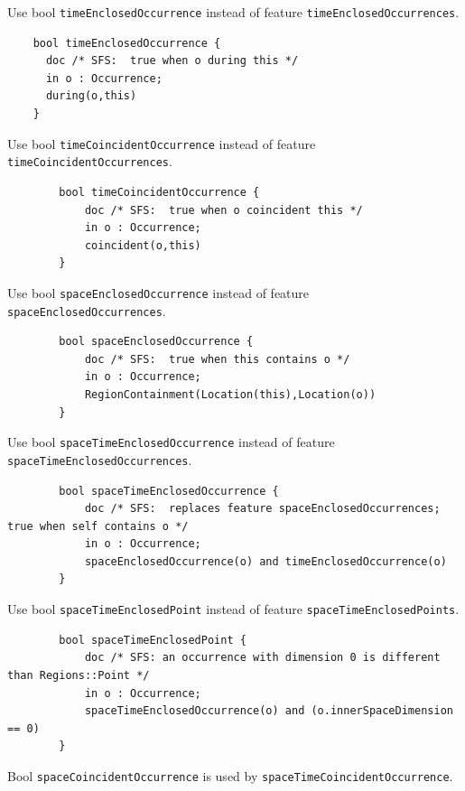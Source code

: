 \pn Use bool \texttt{timeEnclosedOccurrence} instead of feature \texttt{timeEnclosedOccurrences}.

\begin{lstlisting}
    bool timeEnclosedOccurrence {
      doc /* SFS:  true when o during this */
      in o : Occurrence;
      during(o,this)
    }
\end{lstlisting}

\pn Use bool \texttt{timeCoincidentOccurrence} instead of feature \texttt{timeCoincidentOccurrences}.

\begin{lstlisting}
		bool timeCoincidentOccurrence {
			doc /* SFS:  true when o coincident this */
			in o : Occurrence;
			coincident(o,this)
		}
\end{lstlisting}

\pn Use bool \texttt{spaceEnclosedOccurrence} instead of feature \texttt{spaceEnclosedOccurrences}.

\begin{lstlisting}
		bool spaceEnclosedOccurrence {
			doc /* SFS:  true when this contains o */
			in o : Occurrence;
			RegionContainment(Location(this),Location(o))
		}
\end{lstlisting}

\pn Use bool \texttt{spaceTimeEnclosedOccurrence} instead of feature \texttt{spaceTimeEnclosedOccurrences}.

\begin{lstlisting}
		bool spaceTimeEnclosedOccurrence {
			doc /* SFS:  replaces feature spaceEnclosedOccurrences; true when self contains o */
			in o : Occurrence;
			spaceEnclosedOccurrence(o) and timeEnclosedOccurrence(o)
		}
\end{lstlisting}

\pn Use bool \texttt{spaceTimeEnclosedPoint} instead of feature \texttt{spaceTimeEnclosedPoints}.

\begin{lstlisting}
		bool spaceTimeEnclosedPoint {
			doc /* SFS: an occurrence with dimension 0 is different than Regions::Point */
			in o : Occurrence;
			spaceTimeEnclosedOccurrence(o) and (o.innerSpaceDimension == 0)
		}
\end{lstlisting}

\pn Bool \texttt{spaceCoincidentOccurrence} is used by \texttt{spaceTimeCoincidentOccurrence}.

